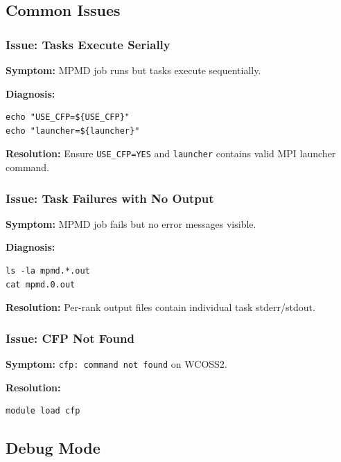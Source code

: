 \documentclass[11pt,a4paper,twoside]{article}
\begin{document}
\subsection{Common Issues}

\subsubsection{Issue: Tasks Execute Serially}

\textbf{Symptom:} MPMD job runs but tasks execute sequentially.

\textbf{Diagnosis:}
\begin{lstlisting}[style=bashstyle,caption={Serial Execution Diagnosis},label={lst:serial}]
echo "USE_CFP=${USE_CFP}"
echo "launcher=${launcher}"
\end{lstlisting}

\textbf{Resolution:} Ensure \texttt{USE\_CFP=YES} and \texttt{launcher} contains valid MPI launcher command.

\subsubsection{Issue: Task Failures with No Output}

\textbf{Symptom:} MPMD job fails but no error messages visible.

\textbf{Diagnosis:}
\begin{lstlisting}[style=bashstyle,caption={Output File Inspection},label={lst:output}]
ls -la mpmd.*.out
cat mpmd.0.out
\end{lstlisting}

\textbf{Resolution:} Per-rank output files contain individual task stderr/stdout.

\subsubsection{Issue: CFP Not Found}

\textbf{Symptom:} \texttt{cfp: command not found} on WCOSS2.

\textbf{Resolution:}
\begin{lstlisting}[style=bashstyle,caption={CFP Module Loading},label={lst:loadcfp}]
module load cfp
\end{lstlisting}

\subsection{Debug Mode}
\end{document}
